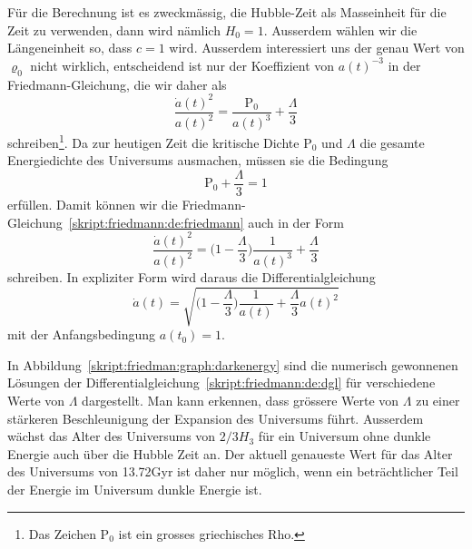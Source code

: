 Für die Berechnung ist es zweckmässig, die Hubble-Zeit als Masseinheit
für die Zeit zu verwenden, dann wird nämlich $H_0=1$.
Ausserdem wählen wir die Längeneinheit so, dass $c=1$ wird.
Ausserdem interessiert uns der genau Wert von $\varrho_0$ nicht wirklich,
entscheidend ist nur der Koeffizient von $a(t)^{-3}$ in der
Friedmann-Gleichung, die wir daher als
\newcommand{\Rho}{\mathrm{P}}
\begin{equation}
\frac{\dot a(t)^2}{a(t)^2}
=
\frac{\Rho_0}{a(t)^3} + \frac{\Lambda}{3}
\label{skript:friedmann:de:friedmann}
\end{equation}
schreiben\footnote{Das Zeichen $\Rho_0$ ist ein grosses griechisches Rho.}.
Da zur heutigen Zeit die kritische Dichte $\Rho_0$ und $\Lambda$ die gesamte
Energiedichte des Universums ausmachen, müssen sie die Bedingung
\begin{equation}
\Rho_0 + \frac{\Lambda}{3}=1
\end{equation}
erfüllen.
Damit können wir die Friedmann-Gleichung~\eqref{skript:friedmann:de:friedmann}
auch in der Form
\begin{equation}
\frac{\dot a(t)^2}{a(t)^2}
=
\biggl(1-\frac{\Lambda}3\biggr)\frac1{a(t)^3} + \frac{\Lambda}3
\label{skript:friedmann:de:simulation}
\end{equation}
schreiben.
In expliziter Form wird daraus die Differentialgleichung
\begin{equation}
\dot a(t)
=
\sqrt{
\biggl(1-\frac{\Lambda}3\biggr)\frac1{a(t)} + \frac{\Lambda}3 a(t)^2
}
\label{skript:friedmann:de:dgl}
\end{equation}
mit der Anfangsbedingung $a(t_0)=1$.

In Abbildung~\ref{skript:friedman:graph:darkenergy} sind die numerisch
gewonnenen Lösungen
der Differentialgleichung~\eqref{skript:friedmann:de:dgl} für verschiedene
Werte von $\Lambda$ dargestellt.
Man kann erkennen, dass grössere Werte von $\Lambda$ zu einer stärkeren
Beschleunigung der Expansion des Universums führt.
Ausserdem wächst das Alter des Universums von $2/3H_3$ für ein
Universum ohne dunkle Energie auch über die Hubble Zeit an.
Der aktuell genaueste Wert für das Alter des Universums von 13.72Gyr
ist daher nur möglich, wenn ein beträchtlicher Teil der Energie im
Universum dunkle Energie ist.

